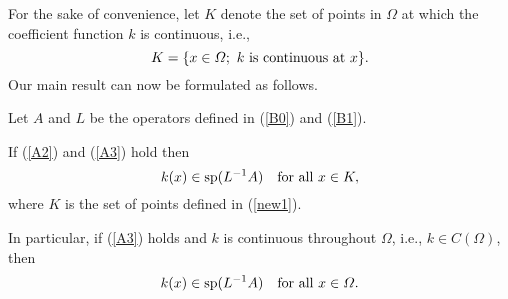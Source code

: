 \documentclass{imanum}
\begin{document}
For the sake of convenience, let $K$ denote the set of points in
$\Omega$ at which the coefficient function $k$ is continuous, i.e.,
\begin{equation}
K=\{ x \in \Omega;\ k \hbox{ is continuous at}\ x \}.
\label{new1}
\end{equation}
Our main result can now be formulated as follows.

\begin{theorem}
\label{theorem1}
Let $A$ and $L$ be the operators defined in (\ref{B0})
and (\ref{B1}).
\begin{NumberedListAlpha}
\item
If (\ref{A2}) and (\ref{A3}) hold then
\begin{equation*}
k(x) \in \mathrm{sp}(L^{-1}A) \quad \hbox{for all}\ x \in K,
\end{equation*}
where $K$ is the set of points defined in (\ref{new1}).
\item
In particular, if (\ref{A3}) holds and $k$ is continuous
throughout $\Omega$, i.e.,  $k \in C(\Omega)$, then
\begin{equation*}
k(x) \in \mathrm{sp}(L^{-1}A) \quad \hbox{for all}\ x \in \Omega.
\end{equation*}
\end{NumberedListAlpha}
\end{theorem}
\end{document}
